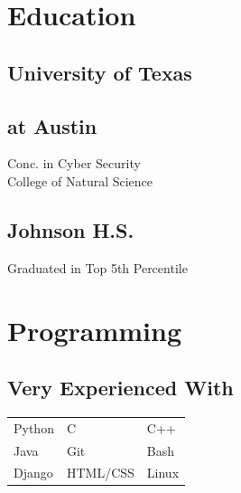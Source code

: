 \documentclass[]{resume}
\begin{document}
\begin{minipage}[t]{0.33\textwidth} 


\section{Education} 

\subsection{University of Texas}
\subsection{at Austin}
\sectionsep


Conc. in Cyber Security \\
College of Natural Science \\
\sectionsep

\vspace{8pt}
\subsection{Johnson H.S.}
Graduated in Top 5th Percentile
\sectionsep
\vspace{20pt}


\section{Programming}

\subsection{Very Experienced With}
\begin{tabular}{lll}
\textbullet{} Python & \textbullet{} C & \textbullet{} C++ \\
\textbullet{} Java & \textbullet{} Git & \textbullet{} Bash \\
\textbullet{} Django & \textbullet{} HTML/CSS & \textbullet{} Linux \\
\end{tabular}


\end{minipage}
\end{document}
